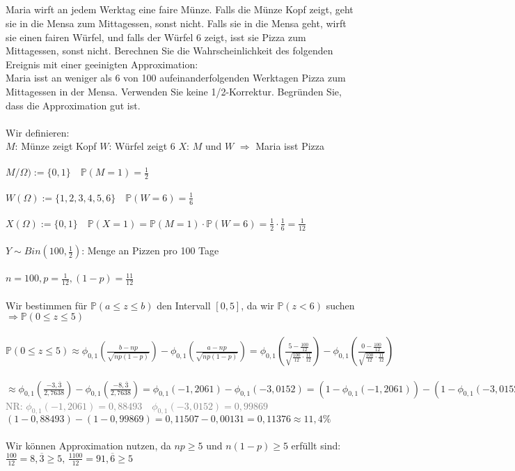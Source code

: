 \documentclass[a4paper]{article}
\begin{document}
\subsection{}
Maria wirft an jedem Werktag eine faire Münze. Falls die Münze Kopf zeigt, geht sie in die Mensa zum Mittagessen, sonst nicht. Falls sie in die Mensa geht, wirft sie einen fairen Würfel, und falls der Würfel 6 zeigt, isst sie Pizza zum Mittagessen, sonst nicht. Berechnen Sie die Wahrscheinlichkeit des folgenden Ereignis mit einer geeinigten Approximation:\\
Maria isst an weniger als 6 von 100 aufeinanderfolgenden Werktagen Pizza zum Mittagessen in der Mensa.
Verwenden Sie keine 1/2-Korrektur. Begründen Sie, dass die Approximation gut ist.\\\\
Wir definieren:\\
$M$: Münze zeigt Kopf \hspace*{1cm}$W$: Würfel zeigt 6 \hspace*{1cm}$X$: $M$ und $W$ $\Rightarrow$ Maria isst Pizza\\\\
\(M/\Omega):=\{0,1\} \quad \mathbb{P}(M=1)=\frac{1}{2}\)\\\\
\(W(\Omega):= \{1,2,3,4,5,6\}\quad \mathbb{P}(W=6)=\frac{1}{6}\)\\\\
\(X(\Omega):=\{0,1\}\quad \mathbb{P}(X=1)=\mathbb{P}(M=1)\cdot \mathbb{P}(W=6)=\frac{1}{2}\cdot \frac{1}{6}=\frac{1}{12}\)\\\\
\(Y \sim Bin\left(100,\frac{1}{2}\right)\): Menge an Pizzen pro 100 Tage\\\\
\(n=100, p=\frac{1}{12}, (1-p)=\frac{11}{12}\)\\\\
Wir bestimmen für $\mathbb{P}(a \leq z \leq b)$ den Intervall $[0,5]$, da wir $\mathbb{P}(z<6)$ suchen $\Rightarrow \mathbb{P}(0 \leq z \leq 5)$\\\\
\(\mathbb{P}(0\leq z \leq 5) \approx \phi_{0,1}\left(\frac{b-np}{\sqrt{np(1-p)}}\right)-\phi_{0,1}\left(\frac{a-np}{\sqrt{np(1-p)}}\right)= \phi_{0,1}\left(\frac{5-\frac{100}{12}}{\sqrt{\frac{100}{12}\cdot \frac{11}{12}}}\right)-\phi_{0,1}\left(\frac{0-\frac{100}{12}}{\sqrt{\frac{100}{12}\cdot \frac{11}{12}}}\right)\)\\\\
\(\approx \phi_{0,1}\left(\frac{-3,\overline{3}}{2,7638}\right)-\phi_{0,1}\left(\frac{-8,\overline{3}}{2,7638}\right)= \phi_{0,1}(-1,2061)-\phi_{0,1}(-3,0152)= (1-\phi_{0,1}(-1,2061))-(1-\phi_{0,1}(-3,0152))\)\\
\textcolor{gray}{NR: $\phi_{0,1}(-1,2061)=0,88493 \quad \phi_{0,1}(-3,0152) = 0,99869$}\\
\((1-0,88493)-(1-0,99869)=0,11507-0,00131 = 0,11376 \approx 11,4\%\)\\\\
Wir können Approximation nutzen, da $np\geq 5$ und $n(1-p)\geq 5$ erfüllt sind: $\frac{100}{12}=8,\overline{3} \geq 5,\, \frac{1100}{12}=91,\overline{6}\geq 5$
\end{document}
